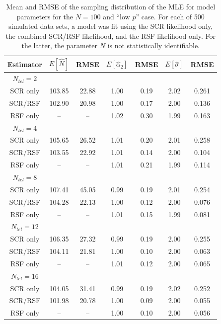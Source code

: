 \begin{table}
\centering
\caption{Mean and RMSE of the sampling distribution of the MLE for
  model parameters for the $N=100$ and ``low $p$'' case. For each of
  500 simulated data sets, a model was fit using the SCR likelihood
  only, the combined SCR/RSF likelihood, and the RSF likelihood only. For
  the latter, the parameter $N$ is not statistically identifiable. }
\begin{tabular}{ccccccc}
\hline \hline
Estimator & $E[\hat{N}]$ & RMSE & $E[\hat{\alpha}_{2}]$ & RMSE &
$E[\hat{\sigma}]$ & RMSE \\
 \hline
$N_{tel} = 2$ &      &      &       &      &    &      \\
SCR only     &103.85& 22.88&   1.00& 0.19& 2.02& 0.261 \\
SCR/RSF      &102.90& 20.98&   1.00& 0.17& 2.00& 0.136\\
RSF only     &--    & --   &  1.02 & 0.30& 1.99& 0.163\\
$N_{tel}=4$   &      &      &       &     &     &        \\
SCR only     &105.65& 26.52&   1.01& 0.20& 2.01& 0.258 \\
SCR/RSF      &103.55& 22.92&   1.01& 0.14& 2.00& 0.104\\
RSF only     & --   & --   &  1.01 & 0.21& 1.99& 0.114\\
$N_{tel}=8$   &      &      &       &     &     &       \\
SCR only     &107.41&  45.05&   0.99& 0.19& 2.01& 0.254 \\
SCR/RSF      &104.28&  22.13&   1.00& 0.12& 2.00& 0.076\\
RSF only     &--    & --    &  1.01& 0.15& 1.99& 0.081\\
$N_{tel}=12$  &      &       &      &     &      &      \\
SCR only     &106.35&  27.32& 0.99& 0.19 & 2.00& 0.255\\
SCR/RSF      &104.11&  21.81& 1.00& 0.10 & 2.00& 0.063\\
RSF only     & --   &  --   & 1.01& 0.12 & 2.00& 0.065\\
$N_{tel}=16$  &      &       &     &      &     &       \\
SCR only     &104.05&  31.41& 0.99& 0.19 & 2.02& 0.252\\
SCR/RSF      &101.98&  20.78& 1.00& 0.09 & 2.00& 0.055\\
RSF only     & --   &  --   & 1.00& 0.10 & 2.00& 0.056\\
\end{tabular}
\label{tab.lowp}
\end{table}









